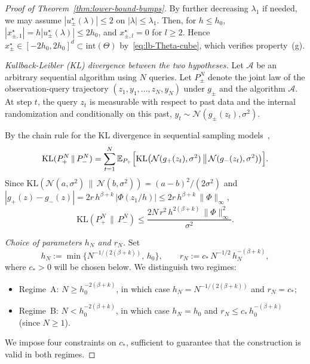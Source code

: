 \documentclass{article}
\renewcommand{\leq}{\leqslant}
\renewcommand{\geq}{\geqslant}
\theoremstyle{definition}
\begin{document}
\begin{proof}[Proof of Theorem~\ref{thm:lower-bound-bumps}]
By further decreasing $\lambda_1$ if needed, we may assume 
$|u_\pm^\star(\lambda)|\leq 2$ on $|\lambda|\leq\lambda_1$. 
Then, for $h\leq h_0$, 
$|x_{\pm,1}^\star|=h|u_\pm^\star(\lambda)|\leq 2h_0$, and 
$x_{\pm,l}^\star=0$ for $l\geq 2$. Hence 
$x_\pm^\star\in[-2h_0,2h_0]^d\subset\mathrm{int}(\Theta)$ 
by~\eqref{eq:lb-Theta-cube}, which verifies property~(g).

\medskip
\noindent\textit{Kullback-Leibler (KL) divergence between the two hypotheses.}
Let $\mathcal{A}$ be an arbitrary sequential algorithm using $N$ queries. Let $P_\pm^N$ denote the joint law of the 
observation-query trajectory $(z_1,y_1,\ldots,z_N,y_N)$ under 
$g_\pm$ and the algorithm $\mathcal{A}$. At step $t$, the query 
$z_t$ is measurable with respect to past data and the internal 
randomization and conditionally on this past, 
$y_t\sim\mathcal{N}(g_\pm(z_t),\sigma^2)$.

By the chain rule for the KL divergence in sequential sampling 
models~\cite[Lemma~15.1]{lattimore2020bandit},
\begin{equation}
\label{eq:lb-chainrule}
\mathrm{KL}(P_+^N\,\|\,P_-^N)
=\sum_{t=1}^N\mathbb{E}_{P_+}\Bigl[
\mathrm{KL}\bigl(\mathcal{N}(g_+(z_t),\sigma^2)\,\big\|\,
\mathcal{N}(g_-(z_t),\sigma^2)\bigr)\Bigr].
\end{equation}
Since 
$\mathrm{KL}(\mathcal{N}(a,\sigma^2)\,\|\,\mathcal{N}(b,\sigma^2))
=(a-b)^2/(2\sigma^2)$ and 
$|g_+(z)-g_-(z)|=2r\,h^{\beta+k}\,|\Phi(z_1/h)|
\leq 2r\,h^{\beta+k}\,\|\Phi\|_\infty$,
\begin{equation}
\label{eq:lb-KL-bound}
\mathrm{KL}(P_+^N\,\|\,P_-^N)
\leq\frac{2N\,r^2\,h^{2(\beta+k)}\,\|\Phi\|_\infty^2}{\sigma^2}.
\end{equation}

\medskip
\noindent\textit{Choice of parameters $h_N$ and $r_N$.}
Set
\begin{equation}
\label{eq:lb-hN-rN}
h_N:=\min\{N^{-1/(2(\beta+k))},\,h_0\},\qquad
r_N:=c_*\,N^{-1/2}\,h_N^{-(\beta+k)},
\end{equation}
where $c_*>0$ will be chosen below. We distinguish two regimes:
\begin{itemize}
\item Regime~A: $N\geq h_0^{-2(\beta+k)}$, in which case 
$h_N=N^{-1/(2(\beta+k))}$ and $r_N=c_*$;
\item Regime~B: $N<h_0^{-2(\beta+k)}$, in which case 
$h_N=h_0$ and $r_N\leq c_*\,h_0^{-(\beta+k)}$ (since $N\geq 1$).
\end{itemize}
We impose four constraints on $c_*$, sufficient to guarantee that 
the construction is valid in both regimes.


\end{proof}
\end{document}
